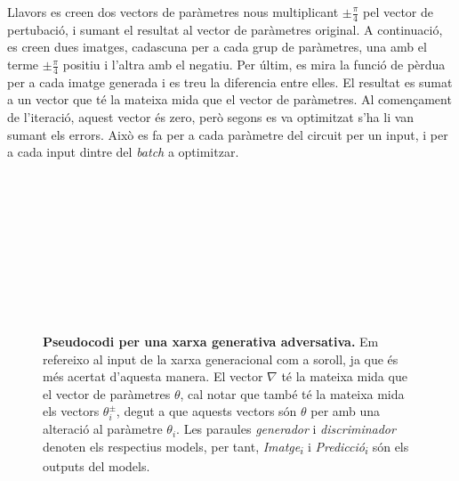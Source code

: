 Llavors es creen dos vectors de paràmetres nous multiplicant $\pm\frac{\pi}{4}$ pel vector de pertubació, i sumant el resultat al vector de paràmetres original. A continuació, es creen dues imatges, cadascuna per a cada grup de paràmetres, una amb el terme $\pm\frac{\pi}{4}$ positiu i l'altra amb el negatiu. Per últim, es mira la funció de pèrdua per a cada imatge generada i es treu la diferencia entre elles. El resultat es sumat a un vector que té la mateixa mida que el vector de paràmetres. Al començament de l'iteració, aquest vector és zero, però segons es va optimitzat s'ha li van sumant els errors. Això es fa per a cada paràmetre del circuit per un input, i per a cada input dintre del \textit{batch} a optimitzar.
\begin{figure}
	\label{fig:alg_gen}
	\HRule \\[-.5cm]
	\begin{algorithmic}[1]
		 
		 
		\\
		 
		\\
		 	 
		\\
		\\
		 
		\EndFor
		\EndFor
		\\
		 
		 
		\EndFor
	\end{algorithmic}
	\HRule \\[-.4cm]
	\caption{\textbf{Pseudocodi per una xarxa generativa adversativa.} Em refereixo al input de la xarxa generacional com a soroll, ja que és més acertat d'aquesta manera. El vector $\nabla$ té la mateixa mida que el vector de paràmetres $\theta$, cal notar que també té la mateixa mida els vectors $\theta^\pm_i$, degut a que aquests vectors són $\theta$ per amb una alteració al paràmetre $\theta_i$. Les paraules \textit{generador} i \textit{discriminador} denoten els respectius models, per tant, \textit{Imatge\textsubscript{$i$}} i \textit{Predicció\textsubscript{$i$}} són els outputs del models.}
\end{figure}


